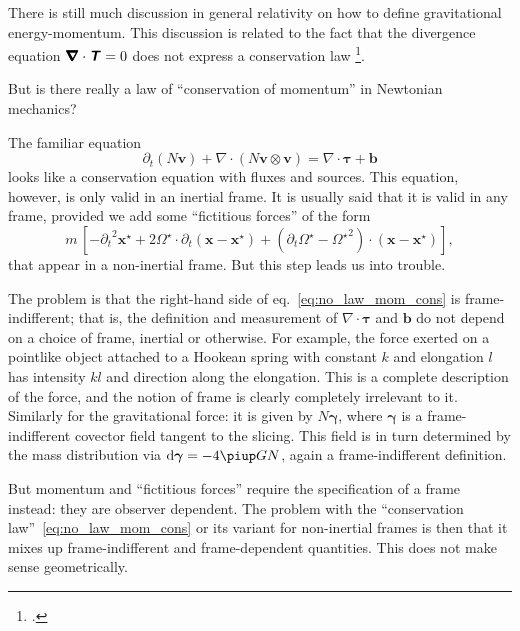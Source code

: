 \documentclass[\ifafour a4paper,12pt,\else a5paper,10pt,\fi%
onecolumn,oneside,article,%
british%
]{memoir}
\theoremstyle{remark}
\theoremstyle{innote}
\newcommand*{\mathte}[1]{\textbf{\textit{\textsf{#1}}}}
\newcommand*{\citep}{\footcites}
\newcommand*{\de}{\partialup}%
\newcommand*{\pu}{\piup}%
\newcommand*{\di}{\mathrm{d}}%
\renewcommand*{\|}[1][]{\nonscript\,#1\vert\nonscript\;\mathopen{}}
\newcommand*{\sect}{\S}%
\newcommand*{\eqn}{eq.}%
\newcommand*{\yd}{N}
\newcommand*{\yTT}{\tau}
\newcommand*{\yT}{\bm{\yTT}}
\newcommand*{\yTTf}{T}
\newcommand*{\yTf}{\mathte{\yTTf}}
\newcommand*{\ybbf}{b}
\newcommand*{\ybf}{\bm{\ybbf}}
\newcommand*{\yxxt}{x}
\newcommand*{\yxt}{\bm{\yxxt}}
\newcommand*{\yxto}{\bm{\yxxt}^{\mathord{\star}}}
\newcommand*{\yvvt}{v}
\newcommand*{\yvt}{\bm{\yvvt}}
\newcommand*{\yffg}{\gamma}
\newcommand*{\yfg}{\bm{\yffg}}
\newcommand*{\yomm}{\varOmega}
\newcommand*{\yom}{\bm{\yomm}^{\mathord{\star}}}
\newcommand*{\ynab}{\nabla}
\newcommand*{\yDi}{\pmb{\bm{\nabla}}}
\begin{document}
There is still much discussion in general relativity on how to define
gravitational energy-momentum. This discussion is related to the fact that
the divergence equation $\yDi\cdot\yTf=0$ does not express a conservation
law \citep[\sect~96]{landauetal1939_t1996}{arminjon2016}.

But is there really a law of \enquote{conservation of momentum} in
Newtonian mechanics?

The familiar equation
\begin{equation}
  \label{eq:no_law_mom_cons}
  \de_t(\yd\yvt) + \ynab\cdot(\yd\yvt\otimes\yvt) = \ynab\cdot\yT +\ybf
\end{equation}
looks like a conservation equation with fluxes and sources. This equation,
however, is only valid in an inertial frame. It is usually said that it is
valid in any frame, provided we add some \enquote{fictitious forces} of the
form
\begin{equation}
  \label{eq:fictitious_forces}
  m\, [-{\de_t}^2\yxto%
  + 2\yom\cdot\de_t(\yxt-\yxto) + (\de_t\yom-{\yom}^2)\cdot(\yxt-\yxto)],
\end{equation}
that appear in a non-inertial frame. But this step leads us into trouble.

The problem is that the right-hand side of \eqn~\eqref{eq:no_law_mom_cons}
is frame-indifferent; that is, the definition and measurement of
$\ynab\cdot\yT$ and $\ybf$ do not depend on a choice of frame, inertial or
otherwise. For example, the force exerted on a pointlike object attached to
a Hookean spring with constant $k$ and elongation $l$ has intensity $kl$
and direction along the elongation. This is a complete description of the
force, and the notion of frame is clearly completely irrelevant to it.
Similarly for the gravitational force: it is given by $\yd\yfg$, where
$\yfg$ is a frame-indifferent covector field tangent to the slicing. This
field is in turn determined by the mass distribution via
$\di\yfg = - 4\pu G \yd$, again a frame-indifferent definition.

But momentum and \enquote{fictitious forces} require the specification of a
frame instead: they are observer dependent. The problem with the
\enquote{conservation law}~\eqref{eq:no_law_mom_cons} or its variant for
non-inertial frames is then that it mixes up frame-indifferent and
frame-dependent quantities. This does not make sense geometrically.
\end{document}
